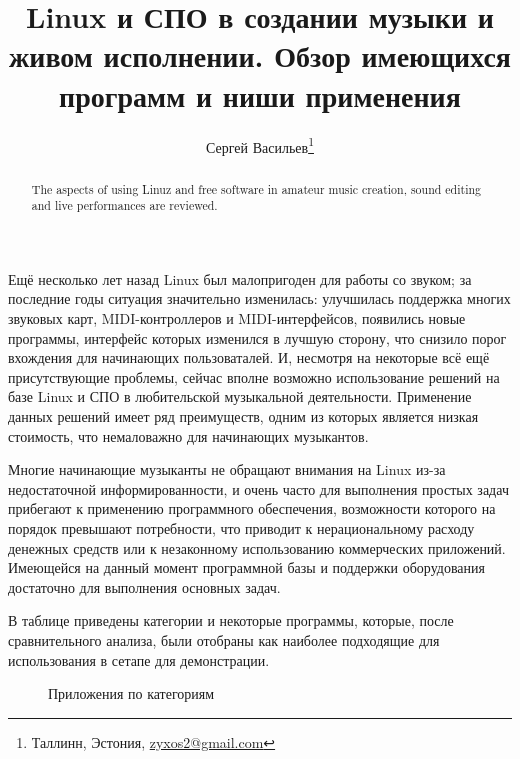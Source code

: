 \documentclass[10pt, a5paper]{article}
\begin{document}
\title{Linux и СПО в создании музыки и живом исполнении. Обзор имеющихся программ и ниши применения}
\author{Сергей Васильев\footnote{Таллинн, Эстония, \url{zyxos2@gmail.com}}}
\date{}
\maketitle
\begin{abstract}
The aspects of using Linuz and free software in amateur music creation, sound editing and live performances are reviewed.
\end{abstract}

Ещё несколько лет назад Linux был малопригоден для работы со звуком; за последние годы ситуация значительно изменилась: улучшилась поддержка многих звуковых карт, MIDI-контроллеров и MIDI-интерфейсов, появились новые программы, интерфейс которых изменился в лучшую сторону, что снизило порог вхождения для начинающих пользоваталей. И, несмотря на некоторые всё ещё присутствующие проблемы, сейчас вполне возможно использование решений на базе Linux и СПО в любительской музыкальной деятельности. Применение данных решений имеет ряд преимуществ, одним из которых является низкая стоимость, что немаловажно для начинающих музыкантов. 

Многие начинающие музыканты не обращают внимания на Linux из-за недостаточной информированности, и очень часто для выполнения простых задач прибегают к применению программного обеспечения, возможности которого на порядок превышают потребности, что приводит к нерациональному расходу денежных средств или к незаконному использованию коммерческих приложений. Имеющейся на данный момент программной базы и поддержки оборудования достаточно для выполнения основных задач. 

В таблице приведены категории и некоторые программы, которые, после сравнительного анализа, были отобраны как наиболее подходящие для использования в сетапе для демонстрации.

\begin{figure}[ht]
\caption{Приложения по категориям}
\end{figure}
\end{document}
